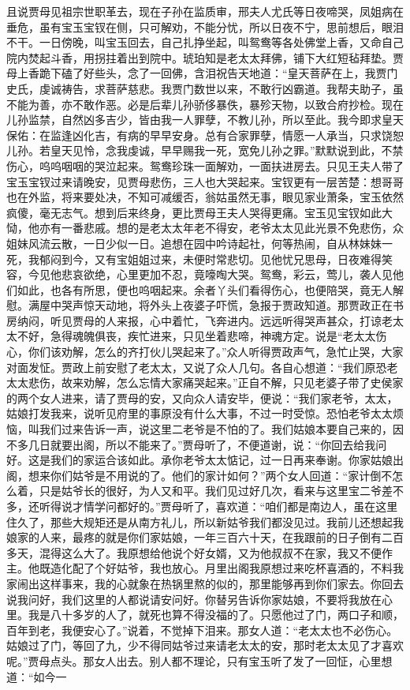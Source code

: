 \begin{parag}
    且说贾母见祖宗世职革去，现在子孙在监质审，邢夫人尤氏等日夜啼哭，凤姐病在垂危，虽有宝玉宝钗在侧，只可解劝，不能分忧，所以日夜不宁，思前想后，眼泪不干。一日傍晚，叫宝玉回去，自己扎挣坐起，叫鸳鸯等各处佛堂上香，又命自己院内焚起斗香，用拐拄着出到院中。琥珀知是老太太拜佛，铺下大红短毡拜垫。贾母上香跪下磕了好些头，念了一回佛，含泪祝告天地道：“皇天菩萨在上，我贾门史氏，虔诚祷告，求菩萨慈悲。我贾门数世以来，不敢行凶霸道。我帮夫助子，虽不能为善，亦不敢作恶。必是后辈儿孙骄侈暴佚，暴殄天物，以致合府抄检。现在儿孙监禁，自然凶多吉少，皆由我一人罪孽，不教儿孙，所以至此。我今即求皇天保佑：在监逢凶化吉，有病的早早安身。总有合家罪孽，情愿一人承当，只求饶恕儿孙。若皇天见怜，念我虔诚，早早赐我一死，宽免儿孙之罪。”默默说到此，不禁伤心，呜呜咽咽的哭泣起来。鸳鸯珍珠一面解劝，一面扶进房去。只见王夫人带了宝玉宝钗过来请晚安，见贾母悲伤，三人也大哭起来。宝钗更有一层苦楚：想哥哥也在外监，将来要处决，不知可减缓否，翁姑虽然无事，眼见家业萧条，宝玉依然疯傻，毫无志气。想到后来终身，更比贾母王夫人哭得更痛。宝玉见宝钗如此大恸，他亦有一番悲戚。想的是老太太年老不得安，老爷太太见此光景不免悲伤，众姐妹风流云散，一日少似一日。追想在园中吟诗起社，何等热闹，自从林妹妹一死，我郁闷到今，又有宝姐姐过来，未便时常悲切。见他忧兄思母，日夜难得笑容，今见他悲哀欲绝，心里更加不忍，竟嚎啕大哭。鸳鸯，彩云，莺儿，袭人见他们如此，也各有所思，便也呜咽起来。余者丫头们看得伤心，也便陪哭，竟无人解慰。满屋中哭声惊天动地，将外头上夜婆子吓慌，急报于贾政知道。那贾政正在书房纳闷，听见贾母的人来报，心中着忙，飞奔进内。远远听得哭声甚众，打谅老太太不好，急得魂魄俱丧，疾忙进来，只见坐着悲啼，神魂方定。说是“老太太伤心，你们该劝解，怎么的齐打伙儿哭起来了。”众人听得贾政声气，急忙止哭，大家对面发怔。贾政上前安慰了老太太，又说了众人几句。各自心想道：“我们原恐老太太悲伤，故来劝解，怎么忘情大家痛哭起来。”正自不解，只见老婆子带了史侯家的两个女人进来，请了贾母的安，又向众人请安毕，便说：“我们家老爷，太太，姑娘打发我来，说听见府里的事原没有什么大事，不过一时受惊。恐怕老爷太太烦恼，叫我们过来告诉一声，说这里二老爷是不怕的了。我们姑娘本要自己来的，因不多几日就要出阁，所以不能来了。”贾母听了，不便道谢，说：“你回去给我问好。这是我们的家运合该如此。承你老爷太太惦记，过一日再来奉谢。你家姑娘出阁，想来你们姑爷是不用说的了。他们的家计如何？”两个女人回道：“家计倒不怎么着，只是姑爷长的很好，为人又和平。我们见过好几次，看来与这里宝二爷差不多，还听得说才情学问都好的。”贾母听了，喜欢道：“咱们都是南边人，虽在这里住久了，那些大规矩还是从南方礼儿，所以新姑爷我们都没见过。我前儿还想起我娘家的人来，最疼的就是你们家姑娘，一年三百六十天，在我跟前的日子倒有二百多天，混得这么大了。我原想给他说个好女婿，又为他叔叔不在家，我又不便作主。他既造化配了个好姑爷，我也放心。月里出阁我原想过来吃杯喜酒的，不料我家闹出这样事来，我的心就象在热锅里熬的似的，那里能够再到你们家去。你回去说我问好，我们这里的人都说请安问好。你替另告诉你家姑娘，不要将我放在心里。我是八十多岁的人了，就死也算不得没福的了。只愿他过了门，两口子和顺，百年到老，我便安心了。”说着，不觉掉下泪来。那女人道：“老太太也不必伤心。姑娘过了门，等回了九，少不得同姑爷过来请老太太的安，那时老太太见了才喜欢呢。”贾母点头。那女人出去。别人都不理论，只有宝玉听了发了一回怔，心里想道：“如今一
\end{parag}
